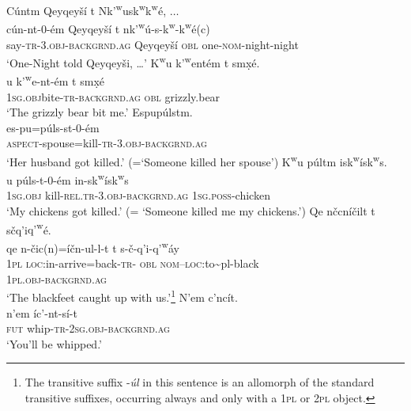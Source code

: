 \documentclass[output=paper,colorlinks,citecolor=brown]{langscibook}
\begin{document}
\ea 
\label{ex-thomason-18}
C\'untm Qeyqey\v{s}\'i t N{k'\textsuperscript w}us{k\textsuperscript w}{k\textsuperscript w}\textglotstop\'e, $\ldots$ \\
 \gll c\'un-nt-0-\'em Qeyqey\v{s}\'i t
n{k'\textsuperscript w}\'u\textglotstop-s-{k\textsuperscript w}-{k\textsuperscript w}\textglotstop\'e(c) \\
say-\textsc{tr}-3.\textsc{obj}-\textsc{backgrnd.ag} Qeyqey\v{s}\'i \textsc{obl} one-\textsc{nom}-night-night \\
 \glt `One-Night told Qeyqey\v{s}i,  \ldots '
 \ex 
\label{ex-thomason-19}
{K\textsuperscript w}u {k'\textsuperscript w}e{\textglotstop}nt\'em t sm\d{x}\'e. \\
u {k'\textsuperscript
 w}e{\textglotstop}-nt-\'em t sm\d{x}\'e\\
\textsc{1sg}.\textsc{obj}bite-\textsc{tr}-\textsc{backgrnd.ag} \textsc{obl} grizzly.bear\\
\glt `The grizzly bear bit me.'
\ex
\label{ex-thomason-20}
Espu{\textglotstop}p\'ulstm.  \\
\gll es-pu\textglotstop=p\'uls-st-0-\'em \\
\textsc{aspect}-spouse=kill-\textsc{tr}-3.\textsc{obj}-\textsc{backgrnd.ag}\\
\glt `Her husband got killed.' (=`Someone killed her spouse')
\ex 
\label{ex-thomason-21}
{K\textsuperscript w}u p\'ul{\textltilde}tm is{k\textsuperscript w}\'is{k\textsuperscript w}s. \\
u p\'uls-{\textltilde}t-0-\'em
in-s{k\textsuperscript w}\'is{k\textsuperscript w}s\\
\textsc{\textsc{1sg}.obj} kill-\textsc{rel.tr}-3.\textsc{obj}-\textsc{backgrnd.ag} \textsc{1sg}.\textsc{poss}-chicken\\
\glt `My chickens got killed.' (= `Someone killed me my chickens.')
\ex 
\label{ex-thomason-22}
Qe n\v{c}cn\'i\v{c}i{\textltilde}lt t s\v{c}q'i{q'\textsuperscript w}\'e.  \\
 \gll qe n-\v{c}ic(n)=\'i\v{c}n-{\textltilde}ul-l-t t
s-\v{c}-q'i-{q'\textsuperscript w}\'ay\\
\textsc{1pl} \textsc{loc}:in-arrive=back-\textsc{tr}-
\textsc{obl} \textsc{nom}--\textsc{loc}:to\textasciitilde{}pl-black\\
\textsc{1pl}.\textsc{obj}-\textsc{backgrnd.ag}\\
 \glt `The blackfeet caught up with
us.'\footnote{The transitive suffix -\emph{{\textltilde}\'ul} in this
sentence is an allomorph of the standard transitive suffixes,
occurring always and only with a \textsc{1pl} or \textsc{2pl} object.}
\ex 
\label{ex-thomason-23}
N'em {\textltilde}c'nc\'it. \\
\gll n'em \textltilde\'ic'-nt-s\'i-t\\ 
\textsc{fut} whip-\textsc{tr}-\textsc{2sg}.\textsc{obj-backgrnd.ag}\\
\glt  `You'll be whipped.'
\z
\end{document}
